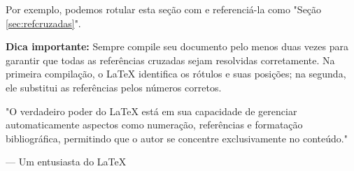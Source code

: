 Por exemplo, podemos rotular esta seção com \label{sec:refcruzadas} e referenciá-la como "Seção \ref{sec:refcruzadas}".

\begin{highlight}
\textbf{Dica importante:} 
Sempre compile seu documento pelo menos duas vezes para garantir que todas as referências cruzadas sejam resolvidas corretamente. Na primeira compilação, o LaTeX identifica os rótulos e suas posições; na segunda, ele substitui as referências pelos números corretos.
\end{highlight}

\begin{quotebox}
"O verdadeiro poder do LaTeX está em sua capacidade de gerenciar automaticamente aspectos como numeração, referências e formatação bibliográfica, permitindo que o autor se concentre exclusivamente no conteúdo."

— Um entusiasta do LaTeX
\end{quotebox}